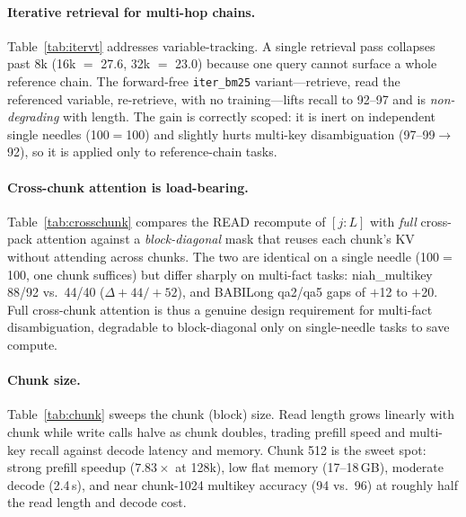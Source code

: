 \paragraph{Iterative retrieval for multi-hop chains.}
Table~\ref{tab:itervt} addresses variable-tracking. A single retrieval pass
collapses past 8k (16k $=$ 27.6, 32k $=$ 23.0) because one query cannot surface a
whole reference chain. The forward-free \texttt{iter\_bm25} variant---retrieve,
read the referenced variable, re-retrieve, with no training---lifts recall to
92--97 and is \emph{non-degrading} with length. The gain is correctly scoped: it
is inert on independent single needles (100$=$100) and slightly hurts multi-key
disambiguation (97--99$\to$92), so it is applied only to reference-chain tasks.



\paragraph{Cross-chunk attention is load-bearing.}
Table~\ref{tab:crosschunk} compares the READ recompute of $[j{:}L]$ with
\emph{full} cross-pack attention against a \emph{block-diagonal} mask that reuses
each chunk's KV without attending across chunks. The two are identical on a
single needle (100$=$100, one chunk suffices) but differ sharply on multi-fact
tasks: niah\_multikey 88/92 vs.\ 44/40 ($\Delta{+}44/{+}52$), and BABILong
qa2/qa5 gaps of $+$12 to $+$20. Full cross-chunk attention is thus a genuine
design requirement for multi-fact disambiguation, degradable to block-diagonal
only on single-needle tasks to save compute.



\paragraph{Chunk size.}
Table~\ref{tab:chunk} sweeps the chunk (block) size. Read length grows linearly
with chunk while write calls halve as chunk doubles, trading prefill speed and
multi-key recall against decode latency and memory. Chunk 512 is the sweet spot:
strong prefill speedup ($7.83\times$ at 128k), low flat memory (17--18\,GB),
moderate decode (2.4\,s), and near chunk-1024 multikey accuracy (94 vs.\ 96) at
roughly half the read length and decode cost.



